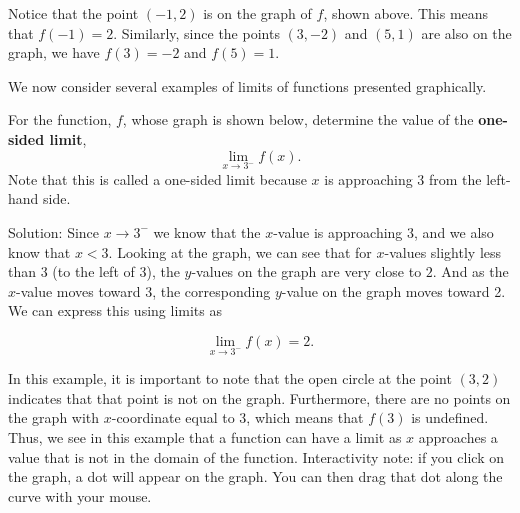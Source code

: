 \documentclass[handout]{ximera}
\begin{document}
Notice that the point $(-1,2)$ is on the graph of $f$, shown above.  This means that $f(-1) = 2$.  
Similarly, since the points $(3,-2)$ and $(5,1)$ are also on the graph, we have $f(3) = -2$ and $f(5) = 1$.  


We now consider several examples of limits of functions presented graphically.



\begin{example}[example 1]

For the function, $f$, whose graph is shown below, determine the value of the \textbf{one-sided limit}, 
\[
\lim_{x\to 3^-} f(x).
\]
Note that this is called a one-sided limit because $x$ is approaching $3$ from the left-hand side.





\vspace{.25in}
Solution: Since $x \to 3^-$ we know that the $x$-value is approaching $3$, and we also know that $x<3$. 
Looking at the graph, we can see that for $x$-values slightly less than $3$ (to the left of 3), 
the $y$-values on the graph are very close to $2$. And as the $x$-value moves toward 3, the corresponding $y$-value on the graph moves toward 2. 
We can express this using limits as 

\[
\lim_{x\to 3^-} f(x) = 2.
\]

In this example, it is important to note that the open circle at the point $(3,2)$ indicates that that point is not on the graph.  Furthermore, there are no points on the graph with $x$-coordinate equal to 3, which means that $f(3)$ is undefined.
Thus, we see in this example that a function can have a limit as $x$ approaches a value that is not in the domain of the function. 
Interactivity note: if you click on the graph,
a dot will appear on the graph.  
You can then drag that dot along the curve with your mouse.

\end{example}
\end{document}
